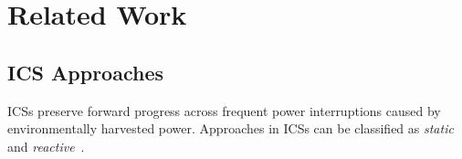 
\section{Related Work} \label{section:review}


\subsection{ICS Approaches}

\color{blue}
ICSs preserve forward progress across frequent power interruptions caused by environmentally harvested power. 
Approaches in ICSs can be classified as \textit{static} and \textit{reactive}~\cite{doi:10.1098/rsta.2019.0158}.\color{black} 

